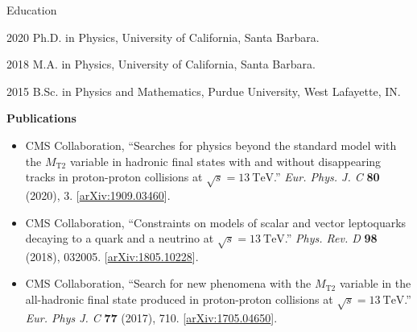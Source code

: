 \begin{vitae}

\begin{vitaesection}{Education}
\vspace{-0.1cm}
\item [2020] Ph.D. in Physics, University of California, Santa Barbara.
\item [2018] M.A. in Physics, University of California, Santa Barbara.
\item [2015] B.Sc. in Physics and Mathematics, Purdue University, West Lafayette, IN.
\end{vitaesection}

\vspace{0.5cm}
\textbf{Publications}


\begin{itemize}

\item CMS Collaboration, ``Searches for physics beyond the standard model with the $M_\mathrm{T2}$ variable in hadronic
  final states with and without disappearing tracks in proton-proton collisions at $\sqrt{s}=13~\mathrm{TeV}$.''
  \textit{Eur. Phys. J. C} \textbf{80} (2020), 3.
  [\href{https://arxiv.org/abs/1909.03460}{arXiv:1909.03460}].

\item CMS Collaboration, ``Constraints on models of scalar and vector leptoquarks decaying to a quark
  and a neutrino at $\sqrt{s}=13~\mathrm{TeV}$.'' \textit{Phys. Rev. D}
  \textbf{98} (2018), 032005. 
  [\href{https://arxiv.org/abs/1805.10228}{arXiv:1805.10228}].

\item CMS Collaboration, ``Search for new phenomena with the $M_\mathrm{T2}$ variable in the all-hadronic
  final state produced in proton-proton collisions at $\sqrt{s}=13~\mathrm{TeV}$.'' \textit{Eur. Phys J. C}
  \textbf{77} (2017), 710.
  [\href{https://arxiv.org/abs/1705.04650}{arXiv:1705.04650}].


\end{itemize}
\end{vitae}
